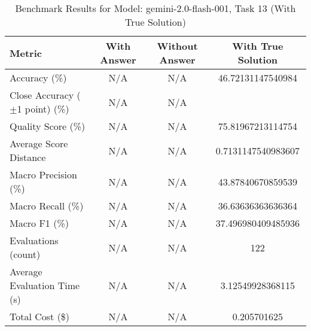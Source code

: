 \begin{table}[htbp]
\centering
\caption{Benchmark Results for Model: gemini-2.0-flash-001, Task 13 (With True Solution)}
\begin{tabular}{lccc}
\toprule
\textbf{Metric} & \textbf{With Answer} & \textbf{Without Answer} & \textbf{With True Solution} \\
\midrule
Accuracy (\%) & N/A & N/A & 46.72131147540984 \\
Close Accuracy ($\pm$1 point) (\%) & N/A & N/A \\
Quality Score (\%) & N/A & N/A & 75.81967213114754 \\
Average Score Distance & N/A & N/A & 0.7131147540983607 \\
Macro Precision (\%) & N/A & N/A & 43.87840670859539 \\
Macro Recall (\%) & N/A & N/A & 36.63636363636364 \\
Macro F1 (\%) & N/A & N/A & 37.496980409485936 \\
Evaluations (count) & N/A & N/A & 122 \\
Average Evaluation Time (s) & N/A & N/A & 3.12549928368115 \\
Total Cost (\$) & N/A & N/A & 0.205701625 \\
\bottomrule
\end{tabular}
\end{table}